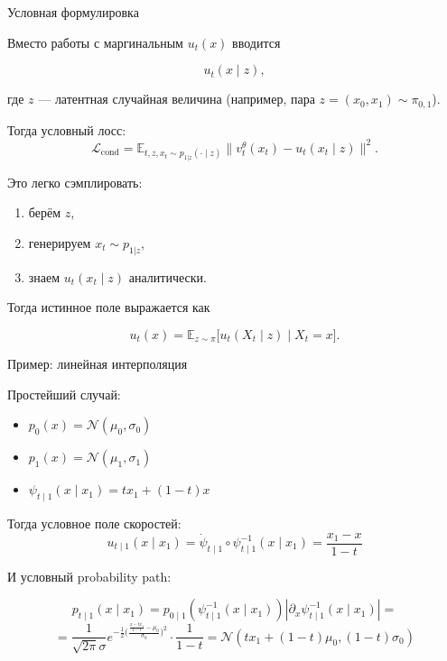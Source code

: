 \documentclass{beamer}
\begin{document}
\begin{frame}{Условная формулировка}

Вместо работы с маргинальным $u_t(x)$ вводится

\[
u_t(x \mid z),
\]

где $z$ — латентная случайная величина (например, пара $z = (x_0, x_1) \sim \pi_{0, 1} $).

Тогда условный лосс:
\[
\mathcal L_{\text{cond}} =
\mathbb E_{t,z,x_t \sim p_{1|z}(\cdot \mid z)}
\| v_t^\theta(x_t) - u_t(x_t \mid z) \|^2.
\]

Это легко сэмплировать:
\begin{enumerate}
    \item берём $z$,
    \item генерируем $x_t \sim p_{1 | z}$,
    \item знаем $u_t(x_t \mid z)$ аналитически.
\end{enumerate}

Тогда истинное поле выражается как

\[
u_t(x)
=
\mathbb{E}_{z \sim \pi} \big[
u_t(X_t \mid z) \mid X_t = x
\big].
\]

\end{frame}

\begin{frame}{Пример: линейная интерполяция}

Простейший случай:

\begin{itemize}
    \item $p_0(x) = \mathcal N(\mu_0, \sigma_0)$
    \item $p_1(x) = \mathcal N(\mu_1, \sigma_1)$
    \item $\psi_{t \mid 1}(x \mid x_1) = t x_1 + (1 - t) x$
\end{itemize}

Тогда условное поле скоростей:
\[
u_{t \mid 1}(x \mid x_1) = \dot{\psi}_{t \mid 1} \circ \psi_{t \mid 1}^{-1}(x \mid x_1) = \frac{x_1 - x}{1 - t}
\]

И условный probability path:

\[
p_{t \mid 1} (x \mid x_1) = p_{0 \mid 1} (\psi_{t \mid 1}^{-1}(x \mid x_1)) | \partial_x\psi_{t \mid 1}^{-1}(x \mid x_1) | = 
\]
\[
= \frac{1}{\sqrt{2 \pi} \sigma} e^{-\frac{1}{2} \Big( \frac{\frac{x - t x_1}{1 - t} - \mu_0}{\sigma_0} \Big)^2} \cdot \frac{1}{1 - t} = 
\mathcal N(t x_1 + (1 - t)\mu_0, (1 - t)\sigma_0)
\]

\end{frame}
\end{document}
